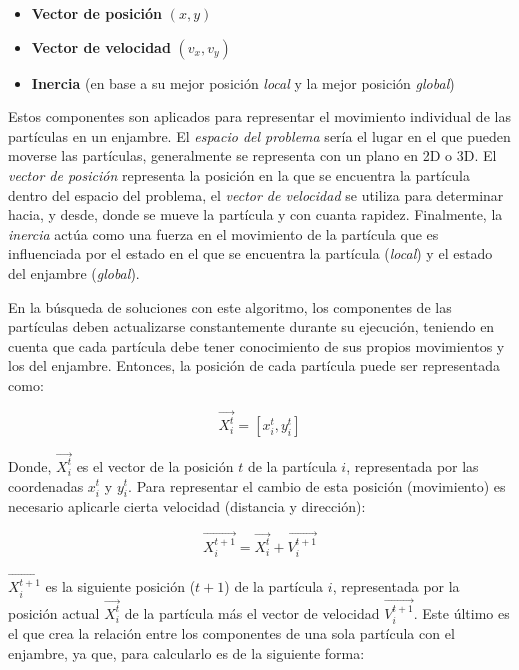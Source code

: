 \documentclass[12pt, a4paper]{article}
\begin{document}
        \begin{itemize}
            \item \textbf{Vector de posición} \((x, y)\)
            \item \textbf{Vector de velocidad} \((v_x, v_y)\)\
            \item \textbf{Inercia} (en base a su mejor posición \emph{local} y la mejor posición \emph{global})
        \end{itemize}

        Estos componentes son aplicados para representar el movimiento individual de las partículas en un enjambre. El \emph{espacio del problema} sería el lugar en el que pueden moverse las partículas, generalmente se representa con un plano en 2D o 3D. El \emph{vector de posición} representa la posición en la que se encuentra la partícula dentro del espacio del problema, el \emph{vector de velocidad} se utiliza para determinar hacia, y desde, donde se mueve la partícula y con cuanta rapidez. Finalmente, la \emph{inercia} actúa como una fuerza en el movimiento de la partícula que es influenciada por el estado en el que se encuentra la partícula (\emph{local}) y el estado del enjambre (\emph{global}).
        
        En la búsqueda de soluciones con este algoritmo, los componentes de las partículas deben actualizarse constantemente durante su ejecución, teniendo en cuenta que cada partícula debe tener conocimiento de sus propios movimientos y los del enjambre. Entonces, la posición de cada partícula puede ser representada como:

        \begin{equation}
            \vec{X_i^t}=[x_i^t,y_i^t]
        \end{equation}

        Donde, \(\vec{X_i^t}\) es el vector de la posición \(t\) de la partícula \(i\), representada por las coordenadas \(x_i^t\) y \(y_i^t\). Para representar el cambio de esta posición (movimiento) es necesario aplicarle cierta velocidad (distancia y dirección):

        \begin{equation}
            \vec{X_i^{t+1}}=\vec{X_i^t}+\vec{V_i^{t+1}}
        \end{equation}
        
        \(\vec{X_i^{t+1}}\) es la siguiente posición (\(t+1\)) de la partícula \(i\), representada por la posición actual \(\vec{X_i^t}\) de la partícula más el vector de velocidad \(\vec{V_i^{t+1}}\). Este último es el que crea la relación entre los componentes de una sola partícula con el enjambre, ya que, para calcularlo es de la siguiente forma:
\end{document}
